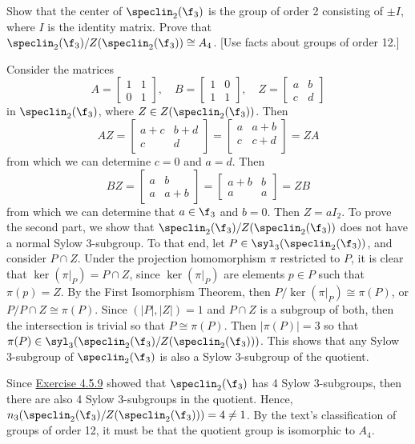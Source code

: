 \newpage

\begin{exercise}\label{ex4.5.11}
	Show that the center of $\speclin_2(\f_3)$ is the group of order 2 consisting of $\pm I$, where $I$ is the identity matrix. Prove that $\speclin_2(\f_3)/Z(\speclin_2(\f_3)) \cong A_4$. [Use facts about groups of order 12.]
\end{exercise}

\begin{sol}
	Consider the matrices
	\[A = 
	\begin{bmatrix}
		1 & 1 \\
		0 & 1
	\end{bmatrix}, \quad 
	B = 
	\begin{bmatrix}
		1 & 0 \\
		1 & 1
	\end{bmatrix}, \quad
	Z = 
	\begin{bmatrix}
		a & b \\
		c & d
	\end{bmatrix}\]
	in $\speclin_2(\f_3)$, where $Z \in Z(\speclin_2(\f_3))$. Then
	\[AZ = 
	\begin{bmatrix}
		a + c & b + d \\
		c & d
	\end{bmatrix} = 
	\begin{bmatrix}
		a & a + b \\
		c & c + d \\
	\end{bmatrix} = ZA\]
	from which we can determine $c = 0$ and $a = d$. Then
	\[BZ = 
	\begin{bmatrix}
		a & b \\
		a & a + b
	\end{bmatrix} = 
	\begin{bmatrix}
		a + b & b \\
		a & a
	\end{bmatrix} = ZB\]
	from which we can determine that $a \in \f_3$ and $b = 0$. Then $Z = aI_2$. To prove the second part, we show that $\speclin_2(\f_3)/Z(\speclin_2(\f_3))$ does not have a normal Sylow 3-subgroup. To that end, let $P \in \syl_3(\speclin_2(\f_3))$, and consider $P \cap Z$. Under the projection homomorphism $\pi$ restricted to $P$, it is clear that $\ker(\pi|_P) = P \cap Z$, since $\ker(\pi|_P)$ are elements $p \in P$ such that $\pi(p) = Z$. By the First Isomorphism Theorem, then $P/\ker(\pi|_P) \cong \pi(P)$, or $P/P \cap Z \cong \pi(P)$. Since $(|P|, |Z|) = 1$ and $P \cap Z$ is a subgroup of both, then the intersection is trivial so that $P \cong \pi(P)$. Then $|\pi(P)| = 3$ so that $\pi(P) \in \syl_3(\speclin_2(\f_3)/Z(\speclin_2(\f_3)))$. This shows that any Sylow 3-subgroup of $\speclin_2(\f_3)$ is also a Sylow 3-subgroup of the quotient.

	Since \hyperref[ex4.5.9]{Exercise 4.5.9} showed that $\speclin_2(\f_3)$ has 4 Sylow 3-subgroups, then there are also 4 Sylow 3-subgroups in the quotient. Hence, $n_3(\speclin_2(\f_3)/Z(\speclin_2(\f_3))) = 4 \neq 1$. By the text's classification of groups of order 12, it must be that the quotient group is isomorphic to $A_4$.
\end{sol}

